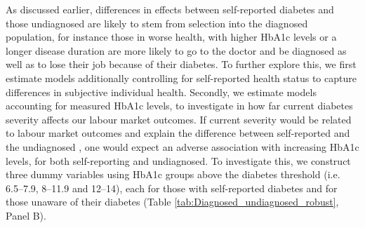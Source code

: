 As discussed earlier, differences in effects between self-reported diabetes and those undiagnosed are likely to stem from selection into the diagnosed population, for instance those in worse health, with higher \ac{HbA1c} levels or a longer disease duration are more likely to go to the doctor and be diagnosed as well as to lose their job because of their diabetes. To further explore this, we first estimate models additionally controlling for self-reported health status to capture differences in subjective individual health. Secondly, we estimate models accounting for measured \ac{HbA1c} levels, to  investigate in how far current diabetes severity affects our labour market outcomes. If current severity would be related to labour market outcomes and explain the difference between self-reported and the undiagnosed \DIFdelbegin {}\DIFdelend \DIFaddbegin {}\DIFaddend , one would expect an adverse association with increasing \ac{HbA1c} levels, for both self-reporting and undiagnosed. To investigate this, we construct three dummy variables using \ac{HbA1c} groups above the diabetes threshold (i.e. 6.5--7.9, 8--11.9 and 12--14), each for those with self-reported diabetes and for those unaware of their diabetes (Table \ref{tab:Diagnosed_undiagnosed_robust}, Panel B).

